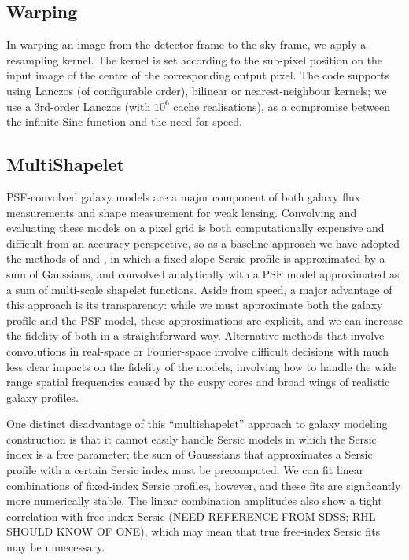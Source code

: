 \documentclass[12pt]{article}
\begin{document}
\subsection{Warping}

In warping an image from the detector frame to the sky frame, we apply a resampling kernel.  The kernel is set
according to the sub-pixel position on the input image of the centre of the corresponding output pixel.  The
code supports using Lanczos (of configurable order), bilinear or nearest-neighbour kernels; we use a 3rd-order
Lanczos (with $10^6$ cache realisations), as a compromise between the infinite Sinc function and the need for
speed.

\subsection{MultiShapelet}

PSF-convolved galaxy models are a major
component of both galaxy flux measurements and shape
measurement for weak lensing.  Convolving and evaluating these models
on a pixel grid is both computationally expensive and difficult from
an accuracy perspective, so as a baseline approach we have adopted the
methods of \cite{HL2013} and \cite{Bosch2010}, in which a fixed-slope
Sersic profile is approximated by a sum of Gaussians,
and convolved analytically with a PSF model approximated as a sum of
multi-scale shapelet functions.  Aside from speed, a major advantage
of this approach is its transparency: while we must approximate both
the galaxy profile and the PSF model, these approximations are
explicit, and we can increase the fidelity of both in a
straightforward way.  Alternative methods that involve convolutions in
real-space or Fourier-space involve difficult decisions with much less
clear impacts on the fidelity of the models, involving how to
handle the wide range spatial frequencies caused by the cuspy cores
and broad wings of realistic galaxy profiles.

One distinct disadvantage of this ``multishapelet'' approach to galaxy
modeling construction is that it cannot easily handle Sersic models in
which the Sersic index is a free parameter; the sum of Gausssians that
approximates a Sersic profile with a certain Sersic index must be
precomputed.  We can fit linear combinations of fixed-index Sersic
profiles, however, and these fits are signficantly more
numerically stable.  The linear combination amplitudes also show a tight
correlation with free-index Sersic (NEED REFERENCE FROM SDSS; RHL
SHOULD KNOW OF ONE), which may mean that true free-index Sersic fits
may be unnecessary.
\end{document}
